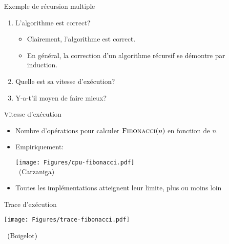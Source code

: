 \begin{frame}{Exemple de récursion multiple}

\begin{center}
\end{center}

\bigskip

\begin{enumerate}
\item L'algorithme est correct?
\begin{itemize}
\item Clairement, l'algorithme est correct.
\item En général, la correction d'un algorithme récursif se démontre par induction.
\end{itemize}
\item Quelle est sa vitesse d'exécution?
\item Y-a-t'il moyen de faire mieux?
\end{enumerate}

\end{frame}

\begin{frame}{Vitesse d'exécution}
\begin{itemize}
\item Nombre d'opérations pour calculer $\textnormal{\scshape Fibonacci}(n)$ en fonction de $n$
\item Empiriquement:

\begin{center}
\texttt{[image: Figures/cpu-fibonacci.pdf]}\\
~\hfill\scriptsize(Carzaniga)
\end{center}

\item Toutes les implémentations atteignent leur limite, plus ou moins loin
\end{itemize}
\end{frame}

\begin{frame}{Trace d'exécution}
\centerline{\texttt{[image: Figures/trace-fibonacci.pdf]}}
~\hfill\scriptsize(Boigelot)
\end{frame}

